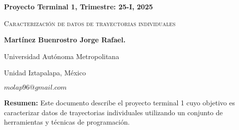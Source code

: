 \documentclass[letterpaper,11pt,twoside]{report}
\date{}
\begin{document}
    \centerline{\bf Proyecto Terminal 1, Trimestre: 25-I, 2025}
    \centerline{}
    \centerline{}
    \begin{center}
    \Large{\textsc{Caracterización de datos de trayectorias individuales}}
    \end{center}
    \centerline{}
    \centerline{\bf {Martínez Buenrostro Jorge Rafael.}}
    \centerline{}
    \centerline{Universidad Aut\'onoma Metropolitana}
    \centerline{Unidad Iztapalapa, M\'exico}
    \centerline{$molap96@gmail.com$}
    \newtheorem{Theorem}{\quad Theorem}[section]
    \newtheorem{Definition}[Theorem]{\quad Definition}
    \newtheorem{Corollary}[Theorem]{\quad Corollary}
    \newtheorem{Lemma}[Theorem]{\quad Lemma}
    \newtheorem{Example}[Theorem]{\quad Example}
    \bigskip
    \textbf{Resumen:}  Este documento describe el proyecto terminal 1 cuyo objetivo es caracterizar datos de trayectorias individuales utilizando un conjunto de herramientas y técnicas de programación. 
	

	
    \newpage
    
\end{document}
